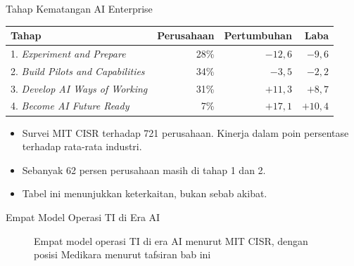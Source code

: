 \documentclass[aspectratio=169, table, 12pt]{beamer}
\begin{document}
\begin{frame}{{\Large Tahap Kematangan AI Enterprise}}
  \footnotesize
  \begin{tabularx}{\textwidth}{Xrrr}
    \hline
    \textbf{Tahap} & \textbf{Perusahaan} & \textbf{Pertumbuhan} & \textbf{Laba} \\
    \hline
    1. \textit{Experiment and Prepare} & 28\% & $-12{,}6$ & $-9{,}6$ \\
    \hline
    2. \textit{Build Pilots and Capabilities} & 34\% & $-3{,}5$ & $-2{,}2$ \\
    \hline
    3. \textit{Develop AI Ways of Working} & 31\% & $+11{,}3$ & $+8{,}7$ \\
    \hline
    4. \textit{Become AI Future Ready} & 7\% & $+17{,}1$ & $+10{,}4$ \\
    \hline
  \end{tabularx}

  \vspace{6pt}
  \small
  \begin{itemize}
    \item Survei MIT CISR terhadap 721 perusahaan. Kinerja dalam poin persentase terhadap rata-rata
          industri.
    \item Sebanyak 62 persen perusahaan masih di tahap 1 dan 2.
    \item Tabel ini menunjukkan keterkaitan, bukan sebab akibat.
  \end{itemize}
\end{frame}

\begin{frame}{{\Large Empat Model Operasi TI di Era AI}}
  \centering
  \begin{figure}
    \resizebox{0.66\textwidth}{!}{}
    \caption{Empat model operasi TI di era AI menurut MIT CISR, dengan posisi Medikara menurut
             tafsiran bab ini}
  \end{figure}
\end{frame}
\end{document}
